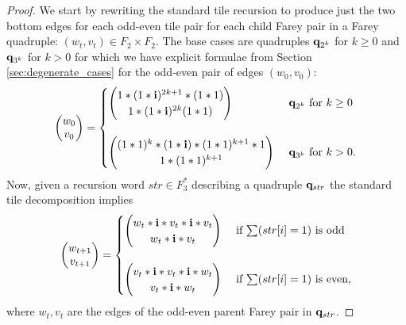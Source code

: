 \documentclass[12pt]{amsart}
\begin{document}
\begin{proof}
	We start by rewriting the standard tile recursion to produce just the two bottom edges for each odd-even tile pair 
	for each child Farey pair in a Farey quadruple: $(w_t, v_t) \in F_2 \times F_2$. The base cases are quadruples $\mathbf{q}_{2^k}$ for $k \geq 0$ and $\mathbf{q}_{3^k}$ for $k > 0$ for which we have explicit formulae from Section \ref{sec:degenerate_cases} for the odd-even pair of edges $(w_0, v_0)$: 
	\[
	\begin{pmatrix}
	w_0 \\
	v_0 
	\end{pmatrix} 
	= \begin{cases}
	\begin{pmatrix} 1*( 1*\mathbf{i})^{2 k +1}*(1*1)  \\
	1*(1*\mathbf{i})^{2k} (1*1)
	\end{pmatrix} &\mbox{ $\mathbf{q}_{2^k}$ for $k \geq 0$ } \\ \\
	\begin{pmatrix} 
	(1*1)^k *(1*\mathbf{i}) *(1*1)^{k+1}*1  \\
	1*(1*1)^{k+1}
	\end{pmatrix} &\mbox{ $\mathbf{q}_{3^k}$ for $k > 0$.} 
	\end{cases}
	\]
	Now, given a recursion word $str \in F_3^*$ describing a quadruple $\mathbf{q}_{str}$ the standard 
	tile decomposition implies 
	\begin{equation}
	\begin{pmatrix}
	w_{t+1} \\
	v_{t+1} 
	\end{pmatrix} 
	= \begin{cases}
	\begin{pmatrix} 
	w_t*\mathbf{i}*v_t*\mathbf{i}*v_t  \\
	w_t*\mathbf{i}*v_t
	\end{pmatrix} &\mbox{ if $\sum (str[i]=1)$ is odd} \\ \\
	
	\begin{pmatrix} 
	v_t*\mathbf{i}*v_t*\mathbf{i}*w_t  \\
	v_t*\mathbf{i}*w_t
	\end{pmatrix} 
	&\mbox{ if $\sum (str[i]=1)$ is even,} 
	\end{cases}
	\end{equation}
	where $w_t,v_t$ are the edges of the odd-even parent Farey pair in $\mathbf{q}_{str}$. 
	

\end{proof}
\end{document}
